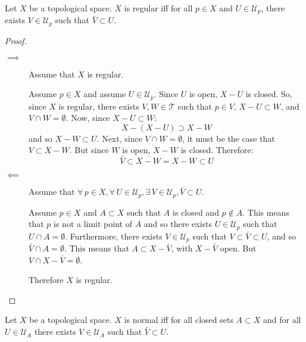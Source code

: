 \documentclass[letterpaper,12pt,fleqn]{article}
\newcommand{\T}{\mathscr{T}}
\newcommand{\U}{\mathcal{U}}
\begin{document}
\begin{theorem}[4.8]
  Let \(X\) be a topological space.  \(X\) is regular iff for all \(p\in X\) and \(U\in\U_p\), there exists
  \(V\in\U_p\) such that \(\bar{V}\subset U\).
\end{theorem}

\begin{proof}
  \begin{description}
  \item[]
  \item[\(\implies\)] Assume that \(X\) is regular.

    Assume \(p\in X\) and assume \(U\in\U_p\).  Since \(U\) is open, \(X-U\) is closed.  So, since \(X\) is
    regular, there exists \(V,W\in\T\) such that \(p\in V\), \(X-U\subset W\), and \(V\cap W=\emptyset\).
    Now, since \(X-U\subset W\):
    \[X-(X-U)\supset X-W\]
    and so \(X-W\subset U\).  Next, since \(V\cap W=\emptyset\), it must be the case that \(V\subset X-W\).  But
    since \(W\) is open, \(X-W\) is closed.  Therefore:
    \[\bar{V}\subset\overline{X-W}=X-W\subset U\]

  \item[\(\impliedby\)] Assume that \(\forall\,p\in X,\forall\,U\in\U_p,\exists\,V\in\U_p,\bar{V}\subset U\).

    Assume \(p\in X\) and \(A\subset X\) such that \(A\) is closed and \(p\notin A\).  This means that \(p\) is
    not a limit point of \(A\) and so there exists \(U\in\U_p\) such that \(U\cap A=\emptyset\).  Furthermore,
    there exists \(V\in\U_p\) such that \(V\subset\bar{V}\subset U\), and so \(\bar{V}\cap A=\emptyset\).  This
    means that \(A\subset X-\bar{V}\), with \(X-\bar{V}\) open.  But \(V\cap X-\bar{V}=\emptyset\).

    Therefore \(X\) is regular.
  \end{description}
\end{proof}

\begin{theorem}[4.9]
  Let \(X\) be a topological space.  \(X\) is normal iff for all closed sets \(A\subset X\) and for all
  \(U\in\U_A\) there exists \(V\in\U_A\) such that \(\bar{V}\subset U\).
\end{theorem}
\end{document}
